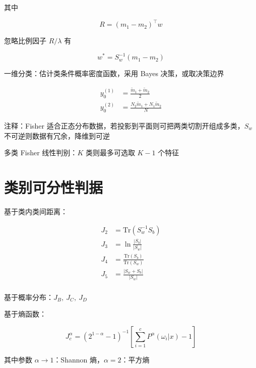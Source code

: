 \documentclass[openany,a4paper,12pt]{ctexbook}
\theoremstyle{kaiti}
\theoremstyle{normal}
\begin{document}
其中

\begin{equation}
R=\left(m_1-m_2 \right)^{\top}w
\end{equation}

忽略比例因子 $R/\lambda$ 有

\begin{equation}
w^*=S_{w}^{-1}\left(m_1-m_2 \right)
\end{equation}

一维分类：估计类条件概率密度函数，采用 Bayes 决策，或取决策边界

\begin{equation}
\begin{aligned}
  y_{0}^{\left(1 \right)}&=\frac{\tilde{m}_1+\tilde{m}_2}{2}\\
  y_{0}^{\left(2 \right)}&=\frac{N_2\tilde{m}_1+N_1\tilde{m}_2}{N}
\end{aligned}
\end{equation}

注释：Fisher 适合正态分布数据，若投影到平面则可把两类切割开组成多类，$S_w$ 不可逆则数据有冗余，降维到可逆

多类 Fisher 线性判别：$K$ 类则最多可选取 $K-1$ 个特征

\section{类别可分性判据}

基于类内类间距离：

\begin{equation}
\begin{aligned}
  J_2&=\mathrm{Tr}\left(S_{w}^{-1}S_b \right)\\
  J_3&=\ln\frac{|S_b|}{|S_w|}\\
  J_4&=\frac{\mathrm{Tr}\left(S_b \right)}{\mathrm{Tr}\left(S_w \right)}\\
  J_5&=\frac{|S_w+S_b|}{|S_w|}\\
\end{aligned}
\end{equation}

基于概率分布：$J_B,~J_C,~J_D$

基于熵函数：

\begin{equation}
J_{c}^{\alpha}=\left(2^{1-\alpha}-1 \right)^{-1}\left[\sum_{i=1}^{c}P^{\alpha}\left(\omega_i|x \right)-1 \right]
\end{equation}

其中参数 $\alpha \rightarrow 1$：Shannon 熵，$\alpha =2$：平方熵
\end{document}

